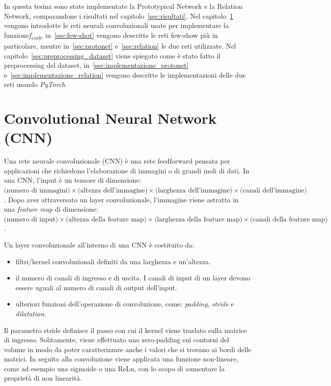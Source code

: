 \documentclass[12pt,a4paper,titlepage]{article}
\begin{document}
In questa tesina sono state implementate la Prototypical Network e la Relation Network, comparandone i risultati nel capitolo~\ref{sec:risultati}. Nel capitolo~\ref{sec:cnn} vengono introdotte le reti neurali convoluzionali usate per implementare la  funzione\textit{f\textsubscript{emb}}, in~\ref{sec:few-shot} vengono descritte le reti few-show più in particolare, mentre in~\ref{sec:protonet} e~\ref{sec:relation} le due reti utilizzate. Nel capitolo~\ref{sec:preprocessing_dataset} viene spiegato come è stato fatto il preprocessing del dataset, in~\ref{sec:implementazione_protonet} e~\ref{sec:implementazione_relation} vengono descritte le implementazioni delle due reti usando \textit{PyTorch}.

\clearpage

\section{Convolutional Neural Network (CNN)}
\label{sec:cnn}
Una rete neurale convoluzionale (CNN) è una rete feedforward pensata per applicazioni che richiedono l'elaborazione di immagini o di grandi moli di dati.
In una CNN, l'input è un tensore di dimensione: $\text{(numero di immagini)} \times \text{(altezza dell'immagine)} \times \text{(larghezza dell'immagine)} \times \text{(canali dell'immagine)}$. Dopo aver attraversato un layer convoluzionale, l'immagine viene astratta in una \textit{feature map} di dimensione: $\text{(numero di input)} \times \text{(altezza della feature map)} \times \text{(larghezza della feature map)} \times \text{(canali della feature map)}$. 

Un layer convoluzionale all'interno di una CNN è costituito da: 
\begin{itemize}
\item filtri/kernel convoluzionali definiti da una larghezza e un'altezza. 
\item il numero di canali di ingresso e di uscita. I canali di input di un layer devono essere uguali al numero di canali di output dell'input. 
\item ulteriori funzioni dell'operazione di convoluzione, come: \textit{padding}, \textit{stride} e \textit{dilatation}.
\end{itemize}

Il parametro stride definisce il passo con cui il kernel viene traslato sulla matrice di ingresso. Solitamente, viene effettuato uno zero-padding sui contorni del volume in modo da poter caratterizzare anche i valori che si trovano ai bordi delle matrici. In seguito alla convoluzione viene applicata una funzione non-lineare, come ad esempio una sigmoide o una ReLu, con lo scopo di aumentare la proprietà di non linearità.
\end{document}
